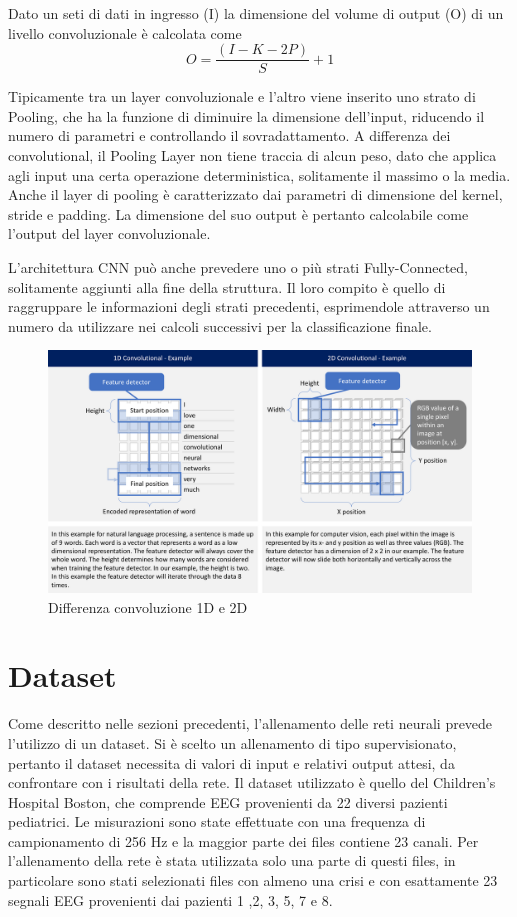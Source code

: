 \documentclass{article}
\begin{document}
Dato un seti di dati in ingresso (I) la dimensione del volume di output (O) di un livello convoluzionale è calcolata come
\begin{equation}
O={\frac{(I - K - 2P)}{S} +1}
\end{equation}

Tipicamente tra un layer convoluzionale e l'altro viene inserito uno strato di Pooling, che ha la funzione di diminuire la dimensione dell'input, riducendo il numero di parametri e controllando il sovradattamento. A differenza dei convolutional, il Pooling Layer non tiene traccia di alcun peso, dato che applica agli input una certa operazione deterministica, solitamente il massimo o la media.
Anche il layer di pooling è caratterizzato dai parametri di dimensione del kernel, stride e padding. La dimensione del suo output è pertanto calcolabile come l'output del layer convoluzionale.

L'architettura CNN può anche prevedere uno o più strati Fully-Connected, solitamente aggiunti alla fine della struttura. Il loro compito è quello di raggruppare le informazioni degli strati precedenti, esprimendole attraverso un numero da utilizzare nei calcoli successivi per la classificazione finale. 

\begin{figure}[!h]
\centering
\includegraphics[scale=0.2]{conv1d}
\caption{Differenza convoluzione 1D e 2D}
\end{figure}

\section{Dataset}
Come descritto nelle sezioni precedenti, l'allenamento delle reti neurali prevede l'utilizzo di un dataset. Si è scelto un allenamento di tipo supervisionato, pertanto il dataset necessita di valori di input e relativi output attesi, da confrontare con i risultati della rete. Il dataset utilizzato è quello del Children's Hospital Boston, che comprende EEG provenienti da 22 diversi pazienti pediatrici. Le misurazioni sono state effettuate con una frequenza di campionamento di 256 Hz e la maggior parte dei files contiene 23 canali. Per l'allenamento della rete è stata utilizzata solo una parte di questi files, in particolare sono stati selezionati files con almeno una crisi e con esattamente 23 segnali EEG provenienti dai pazienti 1 ,2, 3, 5, 7 e 8.
\end{document}
